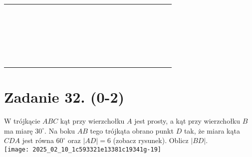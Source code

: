 \documentclass[10pt]{article}
\begin{document}
\begin{center}
\begin{tabular}{|c|c|c|c|c|c|c|c|c|c|c|c|c|c|c|c|c|c|c|c|c|}
\hline
 &  &  &  &  &  &  &  &  &  &  &  &  &  &  &  &  &  &  &  &  \\
\hline
 &  &  &  &  &  &  &  &  &  &  &  &  &  &  &  &  &  &  &  &  \\
\hline
 &  &  &  &  &  &  &  &  &  &  &  &  &  &  &  &  &  &  &  &  \\
\hline
 &  &  &  &  &  &  &  &  &  &  &  &  &  &  &  &  &  &  &  &  \\
\hline
 &  &  &  &  &  &  &  &  &  &  &  &  &  &  &  &  &  &  &  &  \\
\hline
 &  &  &  &  &  &  &  &  &  &  &  &  &  &  &  &  &  &  &  &  \\
\hline
 &  &  &  &  &  &  &  &  &  &  &  &  &  &  &  &  &  &  &  &  \\
\hline
 &  &  &  &  &  &  &  &  &  &  &  &  &  &  &  &  &  &  &  &  \\
\hline
 &  &  &  &  &  &  &  &  &  &  &  &  &  &  &  &  &  &  &  &  \\
\hline
 &  &  &  &  &  &  &  &  &  &  &  &  &  &  &  &  &  &  &  &  \\
\hline
 &  &  &  &  &  &  &  &  &  &  &  &  &  &  &  &  &  &  &  &  \\
\hline
 &  &  &  &  &  &  &  &  &  &  &  &  &  &  &  &  &  &  &  &  \\
\hline
 &  &  &  &  &  &  &  &  &  &  &  &  &  &  &  &  &  &  &  &  \\
\hline
 &  &  &  &  &  &  &  &  &  &  &  &  &  &  &  &  &  &  &  &  \\
\hline
 &  &  &  &  &  &  &  &  &  &  &  &  &  &  &  &  &  &  &  &  \\
\hline
 &  &  &  &  &  &  &  &  &  &  &  &  &  &  &  &  &  &  &  &  \\
\hline
 &  &  &  &  &  &  &  &  &  &  &  &  &  &  &  &  &  &  &  &  \\
\hline
 &  &  &  &  &  &  &  &  &  &  &  &  &  &  &  &  &  &  &  &  \\
\hline
 &  &  &  &  &  &  &  &  &  &  &  &  &  &  &  &  &  &  &  &  \\
\hline
 &  &  &  &  &  &  &  &  &  &  &  &  &  &  &  &  &  &  &  &  \\
\hline
 &  &  &  &  &  &  &  &  &  &  &  &  &  &  &  &  &  &  &  &  \\
\hline
 &  &  &  &  &  &  &  &  &  &  &  &  &  &  &  &  &  &  &  &  \\
\hline
\end{tabular}
\end{center}

\section*{Zadanie 32. (0-2)}
W trójkącie \(A B C\) kąt przy wierzchołku \(A\) jest prosty, a kąt przy wierzchołku \(B\) ma miarę \(30^{\circ}\). Na boku \(A B\) tego trójkąta obrano punkt \(D\) tak, że miara kąta \(C D A\) jest równa \(60^{\circ}\) oraz \(|A D|=6\) (zobacz rysunek). Oblicz \(|B D|\).\\
\texttt{[image: 2025\_02\_10\_1c593321e13381c19341g-19]}
\end{document}
